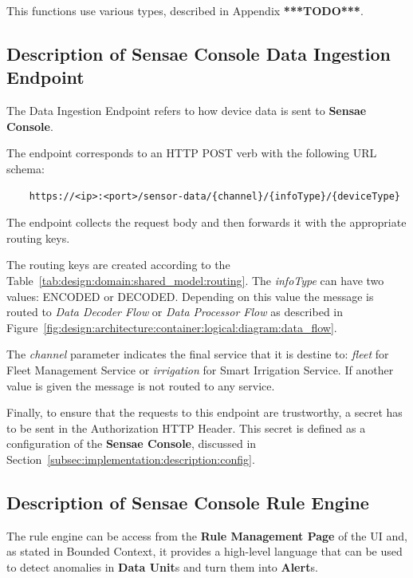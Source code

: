 This functions use various types, described in Appendix \textbf{***TODO***}.

\subsection{Description of Sensae Console Data Ingestion Endpoint}
\label{subsec:implementation:description:ingestion}

The Data Ingestion Endpoint refers to how device data is sent to \textbf{Sensae Console}.

The endpoint corresponds to an HTTP POST verb with the following \gls{URL} schema:

\begin{verbatim}
    https://<ip>:<port>/sensor-data/{channel}/{infoType}/{deviceType}
\end{verbatim}

The endpoint collects the request body and then forwards it with the appropriate routing keys.

The routing keys are created according to the Table~\ref{tab:design:domain:shared_model:routing}. The \textit{infoType} can have two values: ENCODED or DECODED. Depending on this value the message is routed to \textit{Data Decoder Flow} or \textit{Data Processor Flow} as described in Figure~\ref{fig:design:architecture:container:logical:diagram:data_flow}.

The \textit{channel} parameter indicates the final service that it is destine to: \textit{fleet} for Fleet Management Service or \textit{irrigation} for Smart Irrigation Service. If another value is given the message is not routed to any service.

Finally, to ensure that the requests to this endpoint are trustworthy, a secret has to be sent in the Authorization HTTP Header. This secret is defined as a configuration of the \textbf{Sensae Console}, discussed in Section~\ref{subsec:implementation:description:config}.

\subsection{Description of Sensae Console Rule Engine}
\label{subsec:implementation:description:rule}

The rule engine can be access from the \textbf{Rule Management Page} of the UI and, as stated in  Bounded Context, it provides a high-level language that can be used to detect anomalies in \textbf{Data Unit}s and turn them into \textbf{Alert}s.

